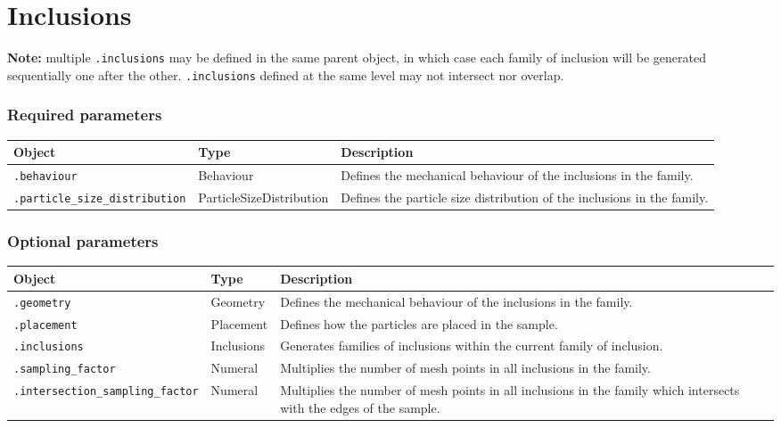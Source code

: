 \documentclass[10pt]{article}
\begin{document}
\section{Inclusions}

\textbf{Note:} multiple \verb+.inclusions+ may be defined in the same parent object, in which case each family of inclusion will be generated sequentially one after the other. \verb+.inclusions+ defined at the same level may not intersect nor overlap.

\subsubsection*{Required parameters}

\begin{tabularx}{\textwidth}{llX}
\hline 
Object & Type & Description \\ 
\hline 
\verb+.behaviour+ & Behaviour & Defines the mechanical behaviour of the inclusions in the family. \\ 
\verb+.particle_size_distribution+ & ParticleSizeDistribution & Defines the particle size distribution of the inclusions in the family.\\ 
\hline 
\end{tabularx}

\subsubsection*{Optional parameters}

\begin{tabularx}{\textwidth}{llX}
\hline 
Object & Type & Description \\ 
\hline 
\verb+.geometry+ & Geometry & Defines the mechanical behaviour of the inclusions in the family. \\ 
\verb+.placement+ & Placement & Defines how the particles are placed in the sample.\\ 
\verb+.inclusions+ & Inclusions & Generates families of inclusions within the current family of inclusion.\\
\verb+.sampling_factor+ & Numeral & Multiplies the number of mesh points in all inclusions in the family.\\
\verb+.intersection_sampling_factor+ & Numeral & Multiplies the number of mesh points in all inclusions in the family which intersects with the edges of the sample.\\
\hline 
\end{tabularx}
\end{document}
